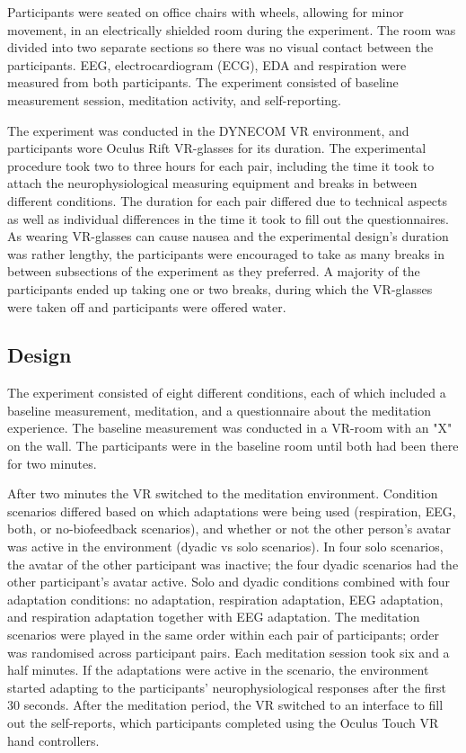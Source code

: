 \documentclass[manuscript, review = false, screen]{acmart}
\begin{document}
Participants were seated on office chairs with wheels, allowing for minor movement, in an electrically shielded room during the experiment. The room was divided into two separate sections so there was no visual contact between the participants. EEG, electrocardiogram (ECG), EDA and respiration were measured from both participants. The experiment consisted of baseline measurement session, meditation activity, and self-reporting.

The experiment was conducted in the DYNECOM VR environment, and participants wore Oculus Rift VR-glasses for its duration. The experimental procedure took two to three hours for each pair, including the time it took to attach the neurophysiological measuring equipment and breaks in between different conditions. The duration for each pair differed due to technical aspects as well as individual differences in the time it took to fill out the questionnaires. As wearing VR-glasses can cause nausea and the experimental design's duration was rather lengthy, the participants were encouraged to take as many breaks in between subsections of the experiment as they preferred. A majority of the participants ended up taking one or two breaks, during which the VR-glasses were taken off and participants were offered water. 

\subsection{Design}
The experiment consisted of eight different conditions, each of which included a baseline measurement, meditation, and a questionnaire about the meditation experience. The baseline measurement was conducted in a VR-room with an "X" on the wall. The participants were in the baseline room until both had been there for two minutes. 

After two minutes the VR switched to the meditation environment. Condition scenarios differed based on which adaptations were being used (respiration, EEG, both, or no-biofeedback scenarios), and whether or not the other person's avatar was active in the environment (dyadic vs solo scenarios). In four solo scenarios, the avatar of the other participant was inactive; the four dyadic scenarios had the other participant's avatar active. Solo and dyadic conditions combined with four adaptation conditions: no adaptation, respiration adaptation, EEG adaptation, and respiration adaptation together with EEG adaptation. The meditation scenarios were played in the same order within each pair of participants; order was randomised across participant pairs. Each meditation session took six and a half minutes. If the adaptations were active in the scenario, the environment started adapting to the participants' neurophysiological responses after the first 30 seconds. After the meditation period, the VR switched to an interface to fill out the self-reports, which participants completed using the Oculus Touch VR hand controllers. 
\end{document}
